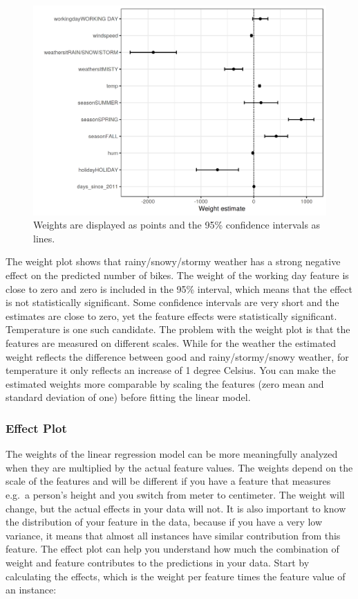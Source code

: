 \documentclass[12pt,]{krantz}
\begin{document}
\begin{figure}

{\centering \includegraphics[width=\textwidth]{images/linear-weights-plot-1} 

}

\caption{Weights are displayed as points and the 95\% confidence intervals as lines.}\label{fig:linear-weights-plot}
\end{figure}

The weight plot shows that rainy/snowy/stormy weather has a strong
negative effect on the predicted number of bikes. The weight of the
working day feature is close to zero and zero is included in the 95\%
interval, which means that the effect is not statistically significant.
Some confidence intervals are very short and the estimates are close to
zero, yet the feature effects were statistically significant.
Temperature is one such candidate. The problem with the weight plot is
that the features are measured on different scales. While for the
weather the estimated weight reflects the difference between good and
rainy/stormy/snowy weather, for temperature it only reflects an increase
of 1 degree Celsius. You can make the estimated weights more comparable
by scaling the features (zero mean and standard deviation of one) before
fitting the linear model.

\subsubsection{Effect Plot}\label{effect-plot}

The weights of the linear regression model can be more meaningfully
analyzed when they are multiplied by the actual feature values. The
weights depend on the scale of the features and will be different if you
have a feature that measures e.g.~a person's height and you switch from
meter to centimeter. The weight will change, but the actual effects in
your data will not. It is also important to know the distribution of
your feature in the data, because if you have a very low variance, it
means that almost all instances have similar contribution from this
feature. The effect plot can help you understand how much the
combination of weight and feature contributes to the predictions in your
data. Start by calculating the effects, which is the weight per feature
times the feature value of an instance:
\end{document}
